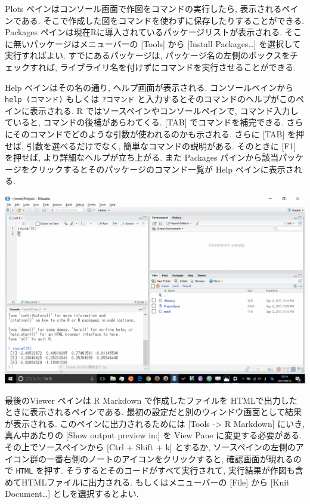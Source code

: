 \documentclass[
  letterpaper,
  xelatex,
  ja=standard, xelatex]{bxjsbook}
\begin{document}
Plots ペインはコンソール画面で作図をコマンドの実行したら,
表示されるペインである.
そこで作成した図をコマンドを使わずに保存したりすることができる. Packages
ペインは現在Rに導入されているパッケージリストが表示される.
そこに無いパッケージはメニューバーの {[}Tools{]} から {[}Install
Packages\ldots{]} を選択して実行すればよい. すでにあるパッケージは,
パッケージ名の左側のボックスをチェックすれば,
ライブライリ名を付けずにコマンドを実行させることができる.

Help ペインはその名の通り, ヘルプ画面が表示される. コンソールペインから
\texttt{help\ (コマンド)} もしくは \texttt{?コマンド}
と入力するとそのコマンドのヘルプがこのペインに表示される. R
ではソースペインやコンソールペインで, コマンド入力していると,
コマンドの後補があらわてくる. {[}TAB{]} でコマンドを補完できる.
さらにそのコマンドでどのような引数が使われるのかも示される. さらに
{[}TAB{]} を押せば, 引数を選べるだけでなく, 簡単なコマンドの説明がある.
そのときに {[}F1{]} を押せば, より詳細なヘルプが立ち上がる. また
Packages
パインから該当パッケージをクリックするとそのパッケージのコマンド一覧が
Help ペインに表示される.

\includegraphics{figs/rstudio_help.gif}

最後のViewer ペインは R Markdown で作成したファイルを
HTMLで出力したときに表示されるペインである.
最初の設定だと別のウィンドウ画面として結果が表示される.
このペインに出力されるためには {[}Tools -\textgreater{} R Markdown{]}
にいき, 真ん中あたりの {[}Show output preview in:{]} を View Pane
に変更する必要がある. その上でソースペインから {[}Ctrl + Shift + k{]}
とするか,
ソースペインの左側のアイコン群の一番右側のノートのアイコンをクリックすると,
確認画面が現れるので \texttt{HTML} を押す.
そうするとそのコードがすべて実行されて,
実行結果が作図も含めてHTMLファイルに出力される. もしくはメニューバーの
{[}File{]} から {[}Knit Document\ldots{]} としを選択するとよい.
\end{document}
